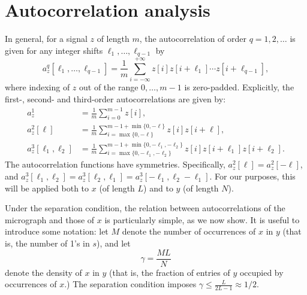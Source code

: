 \documentclass[12pt]{article}
\newcommand{\1}{\mathbf{1}}
\theoremstyle{plain}
\theoremstyle{definition}
\theoremstyle{remark}
\theoremstyle{plain}
\theoremstyle{remark}
\theoremstyle{plain}
\theoremstyle{plain}
\begin{document}
\section{Autocorrelation analysis} \label{sec:AC_analysis}

In general, for a signal $z$ of length $m$, the autocorrelation of order $q = 1, 2, \ldots$ is given for any integer shifts $\ell_1, \ldots, \ell_{q-1}$ by
\begin{equation}
a_z^q[\ell_1,\ldots,\ell_{q-1}]   = \frac{1}{m} \sum_{i=-\infty}^{+\infty} z[i]z[i+\ell_1]\cdots z[i+\ell_{q-1}],
\label{eq:ac_general}
\end{equation}
where indexing of $z$ out of the range $0, \ldots, m-1$ is zero-padded.
Explicitly, the first-, second- and third-order autocorrelations are given by: 
\begin{align} 
a_z^1 & = \frac{1}{m} \sum_{i=0}^{m-1} z[i], \nonumber\\
a_z^2[\ell] & = \frac{1}{m} \sum_{i = \max\{0, -\ell\}}^{m-1 + \min\{0, -\ell\}} z[i]z[i+\ell],\\
a_z^3[\ell_1,\ell_2] & = \frac{1}{m} \sum_{i = \max\{0, -\ell_1, -\ell_2\}}^{m-1 + \min\{0, -\ell_1, -\ell_2\}} z[i]z[i+\ell_1]z[i+\ell_2].  \nonumber \label{eq:ac_special}
\end{align}
The autocorrelation functions have symmetries. Specifically, $a_z^2[\ell] = a_z^2[-\ell]$, and
$a_z^3[\ell_1,\ell_2] = a_z^3[\ell_2,\ell_1]=a_z^3[-\ell_1,\ell_2-\ell_1].
$
For our purposes, this will be applied both to $x$ (of length $L$) and to $y$ (of length $N$).

Under the separation condition, the relation between autocorrelations of the micrograph and those of $x$ is particularly simple, as we now show. It is useful to introduce some notation: let $M$ denote the number of occurrences of $x$ in $y$ (that is, the number of 1's in $s$), and let
\begin{equation}
\gamma  = \frac{M L}{N}
\label{eq:gamma}
\end{equation}
denote the density of $x$ in $y$ (that is, the fraction of entries of $y$ occupied by occurrences of $x$.) The separation condition %
imposes $\gamma\leq\frac{L}{2L-1}\approx 1/2$.
\end{document}

